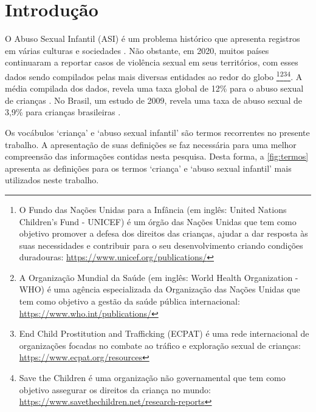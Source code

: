 \chapter{Introdução}\label{ch:Introducao}

O Abuso Sexual Infantil (ASI) é um problema histórico que apresenta registros em várias culturas e sociedades \cite{walker1988physically, aded2006abuso}. Não obstante, em 2020, muitos países continuaram a reportar casos de violência sexual em seus territórios, com esses dados sendo compilados pelas mais diversas entidades ao redor do globo \footnote{O Fundo das Nações Unidas para a Infância (em inglês: United Nations Children's Fund - UNICEF) é um órgão das Nações Unidas que tem como objetivo promover a defesa dos direitos das crianças, ajudar a dar resposta às suas necessidades e contribuir para o seu desenvolvimento criando condições duradouras: \url{https://www.unicef.org/publications/}}\footnote{A Organização Mundial da Saúde (em inglês: World Health Organization - WHO) é uma agência especializada da Organização das Nações Unidas que tem como objetivo a gestão da saúde pública internacional: \url{https://www.who.int/publications/}}\footnote{End Child Prostitution and Trafficking (ECPAT) é uma rede internacional de organizações focadas no combate ao tráfico e exploração sexual de crianças: \url{https://www.ecpat.org/resources}}\footnote{Save the Children é uma organização não governamental que tem como objetivo assegurar os direitos da criança no mundo: \url{https://www.savethechildren.net/research-reports}}. A média compilada dos dados, revela uma taxa global de 12\% para o abuso sexual de crianças \cite{stoltenborgh2011global, azzopardi2019meta}. No Brasil, um estudo de 2009, revela uma taxa de abuso sexual de 3,9\% para crianças brasileiras \cite{bassani2009child}.

Os vocábulos `criança' e `abuso sexual infantil' são termos recorrentes no presente trabalho. A apresentação de suas definições se faz necessária para uma melhor compreensão das informações contidas nesta pesquisa. Desta forma, a \autoref{fig:termos} apresenta as definições para os termos `criança' e `abuso sexual infantil' mais utilizados neste trabalho.



